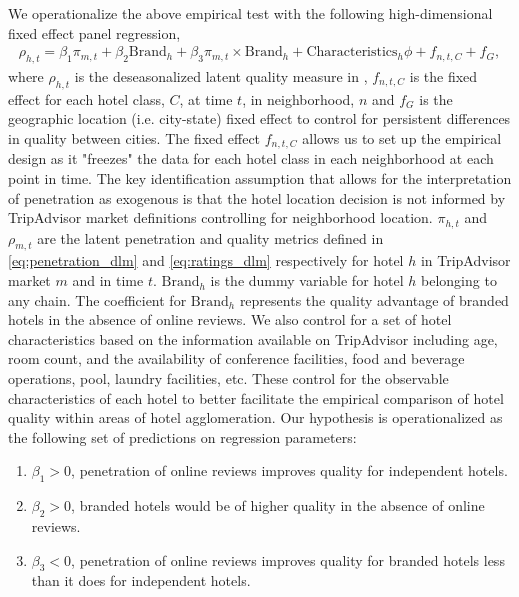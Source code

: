 \documentclass[mksc,blindrev]{informs3} %
\begin{document}
We operationalize the above empirical test with the following high-dimensional fixed effect panel regression,
\begin{equation}\label{eq:nbhd_brand}
\begin{split}
\rho_{h,t}=\beta_{1} \pi_{m,t} + \beta_{2} \text{Brand}_{h} + \beta_{3} \pi_{m,t}\times \text{Brand}_{h} + \text{Characteristics}_h\phi + f_{n,t,C}+f_{G},
\end{split}
\end{equation}
where $\rho_{h,t}$ is the deseasonalized latent quality measure in , $f_{n,t,C}$ is the fixed effect for each hotel class, $C$, at time $t$, in neighborhood, $n$ and $f_{G}$ is the geographic location (i.e. city-state) fixed effect to control for persistent differences in quality between cities. The fixed effect $f_{n,t,C}$ allows us to set up the empirical design as it "freezes" the data for each hotel class in each neighborhood at each point in time. The key identification assumption that allows for the interpretation of penetration as exogenous is that the hotel location decision is not informed by TripAdvisor market definitions controlling for neighborhood location. $\pi_{h,t}$ and $\rho_{m,t}$ are the latent penetration and quality metrics defined in \cref{eq:penetration_dlm} and \cref{eq:ratings_dlm} respectively for hotel $h$ in TripAdvisor market $m$ and in time $t$. $\text{Brand}_h$ is the dummy variable for hotel $h$ belonging to any chain. The coefficient for $\text{Brand}_h$ represents the quality advantage of branded hotels in the absence of online reviews. We also control for a set of hotel characteristics based on the information available on TripAdvisor including age, room count, and the availability of conference facilities, food and beverage operations, pool, laundry facilities, etc. These control for the observable characteristics of each hotel to better facilitate the empirical comparison of hotel quality within areas of hotel agglomeration. Our hypothesis is operationalized as the following set of predictions on regression parameters:
\begin{enumerate}
\item $\beta_1>0$, penetration of online reviews improves quality for independent hotels.
\item $\beta_2>0$, branded hotels would be of higher quality in the absence of online reviews.
\item $\beta_3<0$, penetration of online reviews improves quality for branded hotels less than it does for independent hotels.
\end{enumerate}
\end{document}
